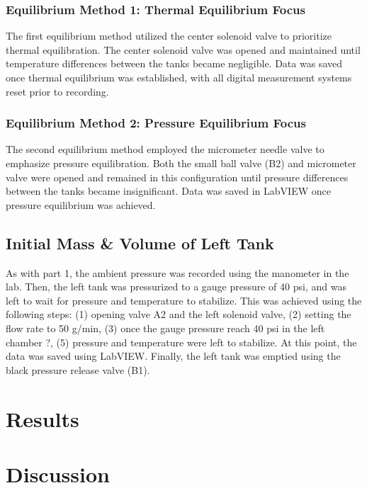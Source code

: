 \documentclass{article} %
\begin{document}
\begin{multicols}{2}
\subsubsection{Equilibrium Method 1: Thermal Equilibrium Focus}

The first equilibrium method utilized the center solenoid valve to prioritize thermal equilibration. The center solenoid valve was opened and maintained until temperature differences between the tanks became negligible. Data was saved once thermal equilibrium was established, with all digital measurement systems reset prior to recording.

\subsubsection{Equilibrium Method 2: Pressure Equilibrium Focus}

The second equilibrium method employed the micrometer needle valve to emphasize pressure equilibration. Both the small ball valve (B2) and micrometer valve were opened and remained in this configuration until pressure differences between the tanks became insignificant. Data was saved in LabVIEW once pressure equilibrium was achieved.
\subsection{Initial Mass \& Volume of Left Tank}
\label{methods_initial_mass_volume_left_tank}

As with part 1, the ambient pressure was recorded using the manometer in the lab.
Then, the left tank was pressurized to a gauge pressure of 40 psi, and was left to wait for pressure and temperature to stabilize.
This was achieved using the following steps:
(1) opening valve A2 and the left solenoid valve, (2) setting the flow rate to 50 g/min, (3) once the gauge pressure reach 40 psi in the left chamber ?, (5) pressure and temperature were left to stabilize.
At this point, the data was saved using LabVIEW.
Finally, the left tank was emptied using the black pressure release valve (B1).

\section{Results}
\label{results}

\section{Discussion}
\label{discussion}


\end{multicols}
\end{document}
